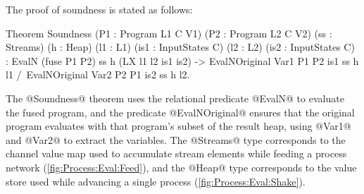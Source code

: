 The proof of soundness is stated as follows:


\begin{coq}
Theorem Soundness (P1 : Program L1 C V1) (P2  : Program L2 C V2)
                  (ss : Streams)         (h   : Heap)
                  (l1 : L1)              (is1 : InputStates C)
                  (l2 : L2)              (is2 : InputStates C)
  :  EvalN (fuse P1 P2) ss h (LX l1 l2 is1 is2)
  -> EvalNOriginal Var1 P1 P2 is1 ss h l1
  /\ EvalNOriginal Var2 P2 P1 is2 ss h l2.
\end{coq}

The @Soundness@ theorem uses the relational predicate @EvalN@ to evaluate the fused program, and the predicate @EvalNOriginal@ ensures that the original program evaluates with that program's subset of the result heap, using @Var1@ and @Var2@ to extract the variables.
The @Streams@ type corresponds to the channel value map used to accumulate stream elements while feeding a process network (\cref{fig:Process:Eval:Feed}), and the @Heap@ type corresponds to the value store used while advancing a single process (\cref{fig:Process:Eval:Shake}).



